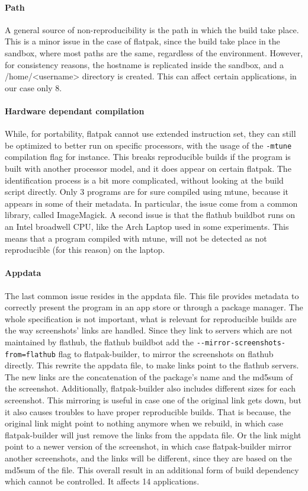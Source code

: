 \documentclass[a4paper,11pt,oneside]{report}
\theoremstyle{definition}
\newcommand{\rb}{reproducible builds\xspace}
\newcommand{\fp}{flatpak\xspace}
\newcommand{\fh}{flathub\xspace}
\newcommand{\fb}{flatpak-builder\xspace}
\newcommand{\fhbb}{flathub buildbot\xspace}
\begin{document}
\paragraph*{Path}
A general source of non-reproducibility is the path in which the build take
place. This is a minor issue in the case of \fp, since the build take
place in the sandbox, where most paths are the same, regardless of the
environment. However, for consistency reasons, the hostname is replicated
inside the sandbox, and a /home/<username> directory is created. This can
affect certain applications, in our case only 8.

\paragraph*{Hardware dependant compilation}
While, for portability, \fp cannot use extended instruction set, they can still
be optimized to better run on specific processors, with the usage of the
\verb|-mtune| compilation flag for instance. This breaks \rb if the program is
built with another processor model, and it does appear on certain \fp. The
identification process is a bit more complicated, without looking at the build
script directly. Only 3 programs are for sure compiled using mtune, because it
appears in some of their metadata. In particular, the issue come from a common
library, called ImageMagick. A second issue is that the \fhbb runs on an Intel
broadwell CPU, like the Arch Laptop used in some experiments. This means that a
program compiled with mtune, will not be detected as not reproducible (for this
reason) on the laptop.

\paragraph*{Appdata}
The last common issue resides in the appdata file. This file provides metadata
to correctly present the program in an app store or through a package manager.
The whole specification is not important, what is relevant for \rb are the way
screenshots' links are handled. Since they link to servers which are not
maintained by \fh, the \fhbb add the \verb|--mirror-screenshots-from=flathub|
flag to \fb, to mirror the screenshots on \fh directly. This rewrite the
appdata file, to make links point to the \fh servers. The new links are the
concatenation of the package's name and the md5sum of the screenshot.
Additionally, \fb also includes different sizes for each screenshot. This
mirroring is useful in case one of the original link gets down, but it also
causes troubles to have proper \rb. That is because, the original link might
point to nothing anymore when we rebuild, in which case \fb will just remove
the links from the appdata file. Or the link might point to a newer version of
the screenshot, in which case \fb mirror another screenshots, and the links
will be different, since they are based on the md5sum of the file. This overall
result in an additional form of build dependency which cannot be controlled.
It affects 14 applications.
\end{document}
